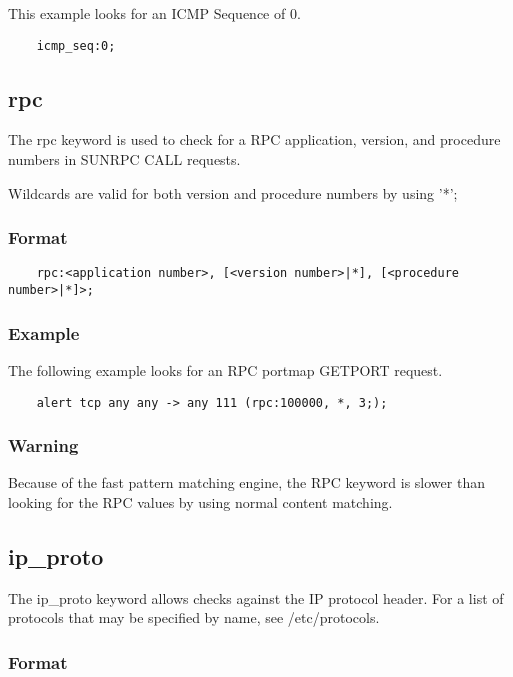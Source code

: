 \documentclass[english]{report}
\begin{document}
This example looks for an ICMP Sequence of 0.

\begin{verbatim}
    icmp_seq:0;
\end{verbatim}

\subsection{rpc}

The rpc keyword is used to check for a RPC application, version, and procedure
numbers in SUNRPC CALL requests.

Wildcards are valid for both version and procedure numbers by using '*';

\subsubsection{Format}

\begin{verbatim}
    rpc:<application number>, [<version number>|*], [<procedure number>|*]>;
\end{verbatim}

\subsubsection{Example}

The following example looks for an RPC portmap GETPORT request.

\begin{verbatim}
    alert tcp any any -> any 111 (rpc:100000, *, 3;);
\end{verbatim}

\subsubsection{Warning}

Because of the fast pattern matching engine, the RPC keyword is slower than
looking for the RPC values by using normal content matching.

\subsection{ip\_proto}

The ip\_proto keyword allows checks against the IP protocol header.  For a list
of protocols that may be specified by name, see /etc/protocols. 

\subsubsection{Format}
\end{document}
